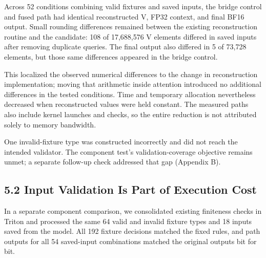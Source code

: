\documentclass[10pt,a4paper]{article}
\begin{document}
Across 52 conditions combining valid fixtures and saved inputs, the bridge control and fused path had identical reconstructed V, FP32 context, and final BF16 output. Small rounding differences remained between the existing reconstruction routine and the candidate: 108 of 17,688,576 V elements differed in saved inputs after removing duplicate queries. The final output also differed in 5 of 73,728 elements, but those same differences appeared in the bridge control.

This localized the observed numerical differences to the change in reconstruction implementation; moving that arithmetic inside attention introduced no additional differences in the tested conditions. Time and temporary allocation nevertheless decreased when reconstructed values were held constant. The measured paths also include kernel launches and checks, so the entire reduction is not attributed solely to memory bandwidth.

One invalid-fixture type was constructed incorrectly and did not reach the intended validator. The component test's validation-coverage objective remains unmet; a separate follow-up check addressed that gap (Appendix B).

\subsection{5.2 Input Validation Is Part of Execution Cost}\label{input-validation-is-part-of-execution-cost}

In a separate component comparison, we consolidated existing finiteness checks in Triton and processed the same 64 valid and invalid fixture types and 18 inputs saved from the model. All 192 fixture decisions matched the fixed rules, and path outputs for all 54 saved-input combinations matched the original outputs bit for bit.
\end{document}
